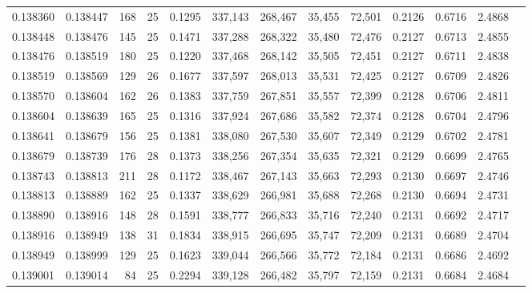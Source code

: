 \begin{tabular}{rrrrrrrrrrrrr}
0.138360 & 0.138447 & 168 &  25 &                                     0.1295 & 337,143 & 268,467 &  35,455 &  72,501 & 0.2126 & 0.6716 & 2.4868 \\
0.138448 & 0.138476 & 145 &  25 &                                     0.1471 & 337,288 & 268,322 &  35,480 &  72,476 & 0.2127 & 0.6713 & 2.4855 \\
0.138476 & 0.138519 & 180 &  25 &                                     0.1220 & 337,468 & 268,142 &  35,505 &  72,451 & 0.2127 & 0.6711 & 2.4838 \\
0.138519 & 0.138569 & 129 &  26 &                                     0.1677 & 337,597 & 268,013 &  35,531 &  72,425 & 0.2127 & 0.6709 & 2.4826 \\
0.138570 & 0.138604 & 162 &  26 &                                     0.1383 & 337,759 & 267,851 &  35,557 &  72,399 & 0.2128 & 0.6706 & 2.4811 \\
0.138604 & 0.138639 & 165 &  25 &                                     0.1316 & 337,924 & 267,686 &  35,582 &  72,374 & 0.2128 & 0.6704 & 2.4796 \\
0.138641 & 0.138679 & 156 &  25 &                                     0.1381 & 338,080 & 267,530 &  35,607 &  72,349 & 0.2129 & 0.6702 & 2.4781 \\
0.138679 & 0.138739 & 176 &  28 &                                     0.1373 & 338,256 & 267,354 &  35,635 &  72,321 & 0.2129 & 0.6699 & 2.4765 \\
0.138743 & 0.138813 & 211 &  28 &                                     0.1172 & 338,467 & 267,143 &  35,663 &  72,293 & 0.2130 & 0.6697 & 2.4746 \\
0.138813 & 0.138889 & 162 &  25 &                                     0.1337 & 338,629 & 266,981 &  35,688 &  72,268 & 0.2130 & 0.6694 & 2.4731 \\
0.138890 & 0.138916 & 148 &  28 &                                     0.1591 & 338,777 & 266,833 &  35,716 &  72,240 & 0.2131 & 0.6692 & 2.4717 \\
0.138916 & 0.138949 & 138 &  31 &                                     0.1834 & 338,915 & 266,695 &  35,747 &  72,209 & 0.2131 & 0.6689 & 2.4704 \\
0.138949 & 0.138999 & 129 &  25 &                                     0.1623 & 339,044 & 266,566 &  35,772 &  72,184 & 0.2131 & 0.6686 & 2.4692 \\
0.139001 & 0.139014 &  84 &  25 &                                     0.2294 & 339,128 & 266,482 &  35,797 &  72,159 & 0.2131 & 0.6684 & 2.4684 \\

\end{tabular}
